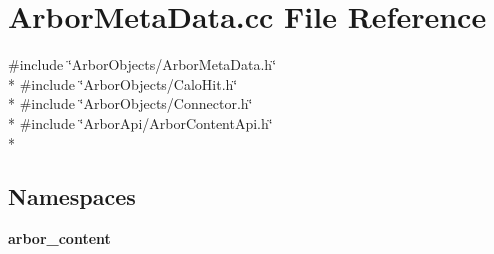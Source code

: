 \section{Arbor\+Meta\+Data.\+cc File Reference}
\label{ArborMetaData_8cc}
{\ttfamily \#include \char`\"{}Arbor\+Objects/\+Arbor\+Meta\+Data.\+h\char`\"{}}\\*
{\ttfamily \#include \char`\"{}Arbor\+Objects/\+Calo\+Hit.\+h\char`\"{}}\\*
{\ttfamily \#include \char`\"{}Arbor\+Objects/\+Connector.\+h\char`\"{}}\\*
{\ttfamily \#include \char`\"{}Arbor\+Api/\+Arbor\+Content\+Api.\+h\char`\"{}}\\*
\subsection*{Namespaces}
\begin{DoxyCompactItemize}
\item 
 {\bf arbor\+\_\+content}
\end{DoxyCompactItemize}

